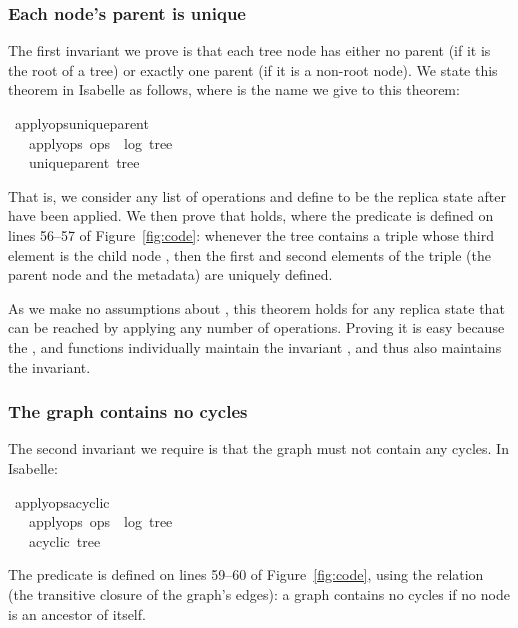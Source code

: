 \documentclass[sigplan,anonymous]{acmart}
\renewenvironment{isabelle}{%
  \medbreak\noindent%
  \renewcommand{\isanewline}{\\}%
  \begin{minipage}{\columnwidth}%
  \begin{isabellebody}%
  \begin{tabbing}%
}{%
  \end{tabbing}%
  \end{isabellebody}%
  \end{minipage}%
  \medbreak%
}
\renewcommand{\isacartoucheopen}{}
\renewcommand{\isacartoucheclose}{}
\begin{document}
\subsubsection{Each node's parent is unique}\label{sec:unique-parent}

The first invariant we prove is that each tree node has either no parent (if it is the root of a tree) or exactly one parent (if it is a non-root node).
We state this theorem in Isabelle as follows, where  is the name we give to this theorem:
\begin{isabelle}
\isamarkupfalse%
\ apply{\isacharunderscore}ops{\isacharunderscore}unique{\isacharunderscore}parent{\isacharcolon}\isanewline
\ \ \ {\isacartoucheopen}apply{\isacharunderscore}ops\ ops\ {\isacharequal}\ {\isacharparenleft}log{\isacharcomma}\ tree{\isacharparenright}{\isacartoucheclose}\isanewline
\ \ \ {\isacartoucheopen}unique{\isacharunderscore}parent\ tree{\isacartoucheclose}
\end{isabelle}
\noindent That is, we consider any list of operations  and define  to be the replica state after  have been applied.
We then prove that  holds, where the  predicate is defined on lines 56--57 of Figure~\ref{fig:code}: whenever the tree contains a triple whose third element is the child node , then the first and second elements of the triple (the parent node and the metadata) are uniquely defined.

As we make no assumptions about , this theorem holds for any replica state that can be reached by applying any number of operations.
Proving it is easy because the ,  and  functions individually maintain the invariant , and thus  also maintains the invariant.

\subsubsection{The graph contains no cycles}\label{sec:no-cycles}

The second invariant we require is that the graph must not contain any cycles.
In Isabelle:
\begin{isabelle}
\isamarkupfalse%
\ apply{\isacharunderscore}ops{\isacharunderscore}acyclic{\isacharcolon}\isanewline
\ \ \ {\isacartoucheopen}apply{\isacharunderscore}ops\ ops\ {\isacharequal}\ {\isacharparenleft}log{\isacharcomma}\ tree{\isacharparenright}{\isacartoucheclose}\isanewline
\ \ \ {\isacartoucheopen}acyclic\ tree{\isacartoucheclose}
\end{isabelle}
\noindent The  predicate is defined on lines 59--60 of Figure~\ref{fig:code}, using the  relation (the transitive closure of the graph's edges): a graph contains no cycles if no node is an ancestor of itself.
\end{document}
